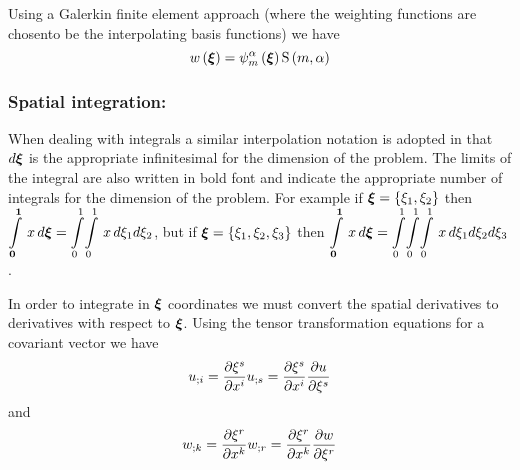 Using a Galerkin finite element approach (where the weighting functions are
chosento be the interpolating basis functions) we have 
\begin{equation}
   w\left( \boldsymbol{\xi} \right) =   \psi_{m}^{\alpha} \left( \boldsymbol{\xi} \right)     \mathrm{S} \left( m,\alpha \right)  
\end{equation}

\subsubsection{Spatial integration:}

When dealing with integrals a similar interpolation notation is adopted in
that $d\boldsymbol{\xi}$ is the appropriate infinitesimal for the dimension of the
problem. The limits of the integral are also written in bold font and indicate
the appropriate number of integrals for the dimension of the problem.  For
example if $\boldsymbol{\xi}=\left\{ \xi_{1},\xi_{2} \right\}$ then
$  \displaystyle\int\limits_{\boldsymbol{0}}^{\boldsymbol{1}} \,x\,d\boldsymbol{\xi} =  \displaystyle\int\limits_{0}^{1} \! \displaystyle\int\limits_{0}^{1} \,x\,d\xi_{1} d\xi_{2} $,
but if $\boldsymbol{\xi}=\left\{ \xi_{1},\xi_{2},\xi_{3} \right\}$ then 
$  \displaystyle\int\limits_{\boldsymbol{0}}^{\boldsymbol{1}} \,x\,d\boldsymbol{\xi} =
 \displaystyle\int\limits_{0}^{1} \! \displaystyle\int\limits_{0}^{1} \! \displaystyle\int\limits_{0}^{1} \,x\,d\xi_{1} d\xi_{2} d\xi_{3}$.

In order to integrate in $\boldsymbol{\xi}$ coordinates we must convert the spatial
derivatives to derivatives with respect to $\boldsymbol{\xi}$. Using the tensor
transformation equations for a covariant vector we have
\begin{equation}  
   {u}_{;i} = \dfrac{\partial \xi^{s}}{\partial x^{i}}  {u}_{;s} =
   \dfrac{\partial \xi^{s}}{\partial x^{i}}  \dfrac{\partial u}{\partial \xi^{s}} 
\end{equation}
and 
\begin{equation}
   {w}_{;k} = \dfrac{\partial \xi^{r}}{\partial x^{k}}  {w}_{;r} =
   \dfrac{\partial \xi^{r}}{\partial x^{k}}  \dfrac{\partial w}{\partial \xi^{r}} 
\end{equation}

